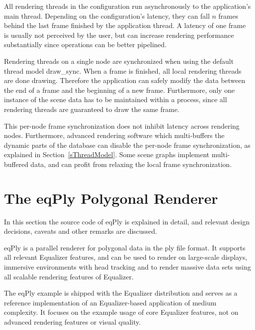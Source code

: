 \documentclass[10pt,a4]{scrartcl}
\newcommand{\sref}[1]{Section~\ref{#1}}
\begin{document}
All rendering threads in the configuration run asynchronously to the
application's main thread. Depending on the configuration's latency,
they can fall $n$ frames behind the last frame finished by the
application thread. A latency of one frame is usually not perceived by
the user, but can increase rendering performance substantially since
operations can be better pipelined.

Rendering threads on a single node are synchronized when using the
default thread model \textsf{draw\_sync}. When a frame is finished, all
local rendering threads are done drawing. Therefore the application can
safely modify the data between the end of a frame and the beginning of a
new frame. Furthermore, only one instance of the scene data has to be
maintained within a process, since all rendering threads are guaranteed
to draw the same frame.

This per-node frame synchronization does not inhibit latency across rendering
nodes. Furthermore, advanced rendering software which multi-buffers the dynamic
parts of the database can disable the per-node frame synchronization, as
explained in \sref{sThreadModel}. Some scene graphs implement multi-buffered
data, and can profit from relaxing the local frame synchronization.



\section{\label{sEqPly}The eqPly Polygonal Renderer}

In this section the source code of \textsf{eqPly} is explained in
detail, and relevant design decisions, caveats and other remarks are
discussed.

\textsf{eqPly} is a parallel renderer for polygonal data in the
\textsf{ply} file format. It supports all relevant Equalizer features,
and can be used to render on large-scale displays, immersive
environments with head tracking and to render massive data sets using
all scalable rendering features of Equalizer.

The \textsf{eqPly} example is shipped with the Equalizer distribution
and serves as a reference implementation of an Equalizer-based
application of medium complexity. It focuses on the example usage of
core Equalizer features, not on advanced rendering features or visual
quality.
\end{document}
